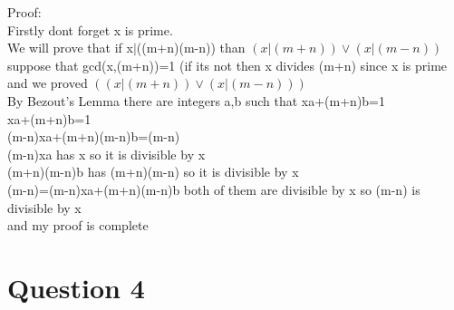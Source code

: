 \documentclass[12pt]{article}
\begin{document}
Proof:\\
Firstly dont forget x is prime.\\
We will prove that if x$|$((m+n)(m-n)) than $(x|(m+n))\lor(x|(m-n))$\\ 
suppose that gcd(x,(m+n))=1 (if its not then x divides (m+n) since x is prime and we proved $((x|(m+n))\lor(x|(m-n)))$\\
By Bezout's Lemma there are integers a,b such that xa+(m+n)b=1\\
xa+(m+n)b=1\\
(m-n)xa+(m+n)(m-n)b=(m-n)\\
(m-n)xa has x so it is divisible by x\\
(m+n)(m-n)b has (m+n)(m-n) so it is divisible by x\\
(m-n)=(m-n)xa+(m+n)(m-n)b both of them are divisible by x so (m-n) is divisible by x\\
and my proof is complete\\

\section*{Question 4}
\end{document}
